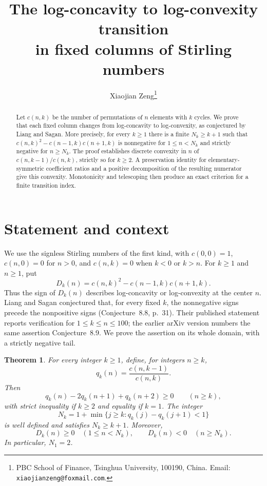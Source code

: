 \documentclass[11pt,a4paper]{article}
\title{The log-concavity to log-convexity transition\protect\\
in fixed columns of Stirling numbers}
\author{Xiaojian Zeng\thanks{PBC School of Finance, Tsinghua University,
100190, China. Email: \texttt{xiaojianzeng@foxmail.com}.}}
\date{}
\newtheorem{theorem}{Theorem}
\theoremstyle{remark}
\newcommand{\D}{D_k}
\begin{document}
\maketitle
\begin{abstract}
Let $c(n,k)$ be the number of permutations of $n$ elements with $k$ cycles.
We prove that each fixed column changes from log-concavity to log-convexity,
as conjectured by Liang and Sagan. More precisely, for every $k\geq1$ there
is a finite $N_k\geq k+1$ such that
$c(n,k)^2-c(n-1,k)c(n+1,k)$ is nonnegative for $1\leq n<N_k$ and strictly
negative for $n\geq N_k$. The proof establishes discrete convexity in $n$
of $c(n,k-1)/c(n,k)$, strictly so for $k\geq2$. A preservation identity
for elementary-symmetric coefficient ratios and a positive decomposition
of the resulting numerator give this convexity. Monotonicity and telescoping
then produce an exact criterion for a finite transition index.
\end{abstract}

\section{Statement and context}

We use the signless Stirling numbers of the first kind, with
$c(0,0)=1$, $c(n,0)=0$ for $n>0$, and $c(n,k)=0$ when $k<0$ or $k>n$.
For $k\geq1$ and $n\geq1$, put
\[
  \D(n)=c(n,k)^2-c(n-1,k)c(n+1,k).
\]
Thus the sign of $\D(n)$ describes log-concavity or log-convexity at the
center $n$. Liang and Sagan conjectured that, for every fixed $k$, the
nonnegative signs precede the nonpositive signs
\cite{LiangSagan2026} (Conjecture~8.8, p.~31). Their published statement
reports verification for $1\leq k\leq n\leq100$; the earlier arXiv version
numbers the same assertion Conjecture~8.9. We prove the assertion on its
whole domain, with a strictly negative tail.

\begin{theorem}\label{thm:main}
For every integer $k\geq1$, define, for integers $n\geq k$,
\[
  q_k(n)=\frac{c(n,k-1)}{c(n,k)}.
\]
Then
\begin{equation}\label{eq:qconvex}
 q_k(n)-2q_k(n+1)+q_k(n+2)\geq0 \qquad(n\geq k),
\end{equation}
with strict inequality if $k\geq2$ and equality if $k=1$.
The integer
\begin{equation}\label{eq:threshold}
 N_k=1+\min\{j\geq k:q_k(j)-q_k(j+1)<1\}
\end{equation}
is well defined and satisfies $N_k\geq k+1$. Moreover,
\[
 \D(n)\geq0 \quad(1\leq n<N_k),\qquad
 \D(n)<0 \quad(n\geq N_k).
\]
In particular, $N_1=2$.
\end{theorem}
\end{document}
